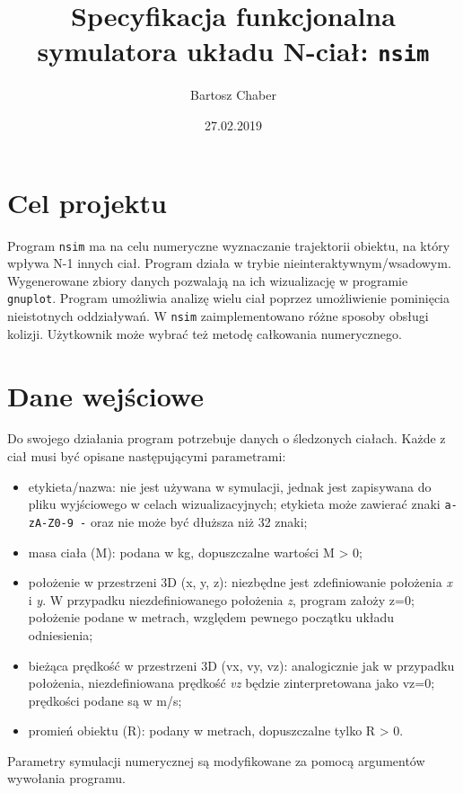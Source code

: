 \documentclass[]{article}
\title{Specyfikacja funkcjonalna symulatora układu N-ciał: \texttt{nsim}}
\author{Bartosz Chaber}
\date{27.02.2019}
\begin{document}
\maketitle

\section{Cel projektu}\label{header-n231}

Program \texttt{nsim} ma na celu numeryczne wyznaczanie trajektorii
obiektu, na który wpływa N-1 innych ciał. Program działa w trybie
nieinteraktywnym/wsadowym. Wygenerowane zbiory danych pozwalają na ich
wizualizację w programie \texttt{gnuplot}. Program umożliwia analizę
wielu ciał poprzez umożliwienie pominięcia nieistotnych oddziaływań. W
\texttt{nsim} zaimplementowano różne sposoby obsługi kolizji. Użytkownik
może wybrać też metodę całkowania numerycznego.

\section{Dane wejściowe}\label{header-n233}

Do swojego działania program potrzebuje danych o śledzonych ciałach.
Każde z ciał musi być opisane następującymi parametrami:

\begin{itemize}
\item
  etykieta/nazwa: nie jest używana w symulacji, jednak jest zapisywana
  do pliku wyjściowego w celach wizualizacyjnych; etykieta może zawierać
  znaki \texttt{a-zA-Z0-9\ -} oraz nie może być dłuższa niż 32 znaki;
\item
  masa ciała (M): podana w kg, dopuszczalne wartości M \textgreater{} 0;
\item
  położenie w przestrzeni 3D (x, y, z): niezbędne jest zdefiniowanie
  położenia \emph{x} i \emph{y}. W przypadku niezdefiniowanego położenia
  \emph{z}, program założy z=0; położenie podane w metrach, względem
  pewnego początku układu odniesienia;
\item
  bieżąca prędkość w przestrzeni 3D (vx, vy, vz): analogicznie jak w
  przypadku położenia, niezdefiniowana prędkość \emph{vz} będzie
  zinterpretowana jako vz=0; prędkości podane są w m/s;
\item
  promień obiektu (R): podany w metrach, dopuszczalne tylko R
  \textgreater{} 0.
\end{itemize}

Parametry symulacji numerycznej są modyfikowane za pomocą argumentów
wywołania programu.
\end{document}
